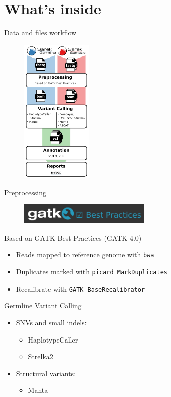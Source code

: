 \documentclass[usepdftitle=false]{beamer}
\begin{document}
\section{What's inside}

\begin{frame}{Data and files workflow}
	\begin{figure}
		\includegraphics[height=7cm]{pictures/Sarek_workflow_3}
	\end{figure}
\end{frame}

\begin{frame}{Preprocessing}
	\begin{figure}
		\includegraphics[height=1cm]{pictures/GATKBP}
	\end{figure}
	Based on GATK Best Practices (GATK 4.0)

	\begin{itemize}
		\item Reads mapped to reference genome with \texttt{bwa}
		\item Duplicates marked with \texttt{picard MarkDuplicates}
		\item Recalibrate with \texttt{GATK BaseRecalibrator}
	\end{itemize}

\end{frame}

\begin{frame}{Germline Variant Calling}
	\begin{itemize}
		\item SNVs and small indels:
	\begin{itemize}
			\item HaplotypeCaller
			\item Strelka2
		\end{itemize}
		\item Structural variants:
		\begin{itemize}
			\item Manta
		\end{itemize}
	\end{itemize}
\end{frame}
\end{document}
